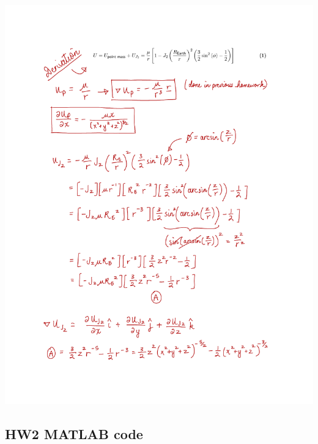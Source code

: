 \documentclass[conf]{new-aiaa}
\begin{document}
\includegraphics[page=3, width=\textwidth]{dUdx_derivation.pdf}

\newpage
\subsection*{HW2 MATLAB code} 
\end{document}
